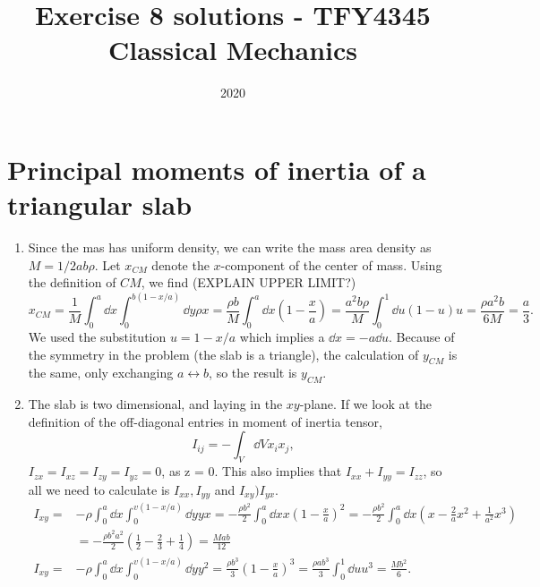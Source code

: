 \documentclass{article}
\title{Exercise 8 solutions - TFY4345 Classical Mechanics}
\date{2020}
\begin{document}
    \maketitle
    \section{Principal moments of inertia of a triangular slab}
    \begin{enumerate}[label=(\alph*)]
        \item Since the mas has uniform density, we can write the mass area density as $M =   1/2 ab\rho$. Let $x_{CM}$ denote the $x$-component of the center of mass. Using the definition of $CM$, we find (EXPLAIN UPPER LIMIT?)
        \begin{equation*}
            x_{CM} = \frac{1}{M} \int_0^a \dd x \int_0^{b(1 - x / a)} \dd y \rho x = \frac{\rho b}{M} \int_0^a \dd x \left( 1 - \frac{x}{a}\right) = \frac{a^2 b \rho}{M} \int_0^1 \dd u (1 - u)u = \frac{\rho a^2 b}{6M} = \frac{a}{3}. 
        \end{equation*}
        We used the substitution $u = 1 - x/a$ which implies a $ \dd x = - a \dd u $. Because of the symmetry in the problem (the slab is a triangle), the calculation of $y_{CM}$ is the same, only exchanging $ a \leftrightarrow b $, so the result is $y_{CM}$.
        \item The slab is two dimensional, and laying in the $xy$-plane. If we look at the definition of the off-diagonal entries in moment of inertia tensor,
        \begin{equation*}
            I_{ij} = - \int_V \dd V x_ix_j,
        \end{equation*} $I_{zx} = I_{xz} = I_{zy} = I_{yz} = 0$, as  z = 0. This also implies that $I_{xx} + I_{yy} = I_{zz}$, so all we need to calculate is $I_{xx}, I_{yy}$ and $I_{xy} ) I_{yx}$.
        \begin{align*}
            I_{xy} =& -\rho \int_0^a \dd x \int_0^{v(1 - x/a)} \dd y yx = - \frac{\rho b^2}{2}\int_0^a \dd x x \left( 1 - \frac{x}{a} \right)^2 = - \frac{\rho b^2}{2} \int_0^a \dd x \left( x - \frac{2}{a}x^2 + \frac{1}{a^2} x^3\right) \\
            &= -\frac{\rho b^2 a^2}{2}\left( \frac{1}{2} - \frac{2}{3} + \frac{1}{4} \right) = \frac{M a b}{12} \\
            I_{xy} = & -\rho \int_0^a \dd x \int_0^{v(1 - x/a)} \dd y y^2 = \frac{\rho b^3}{3}
            \left(1 - \frac{x}{a}\right)^3 = \frac{\rho a b^3}{3} \int_0^1 \dd u u^3 = \frac{M b^2}{6}.

\end{align*}
\end{enumerate}
\end{document}
